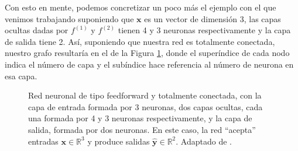 \documentclass[../../main.tex]{subfiles}
\begin{document}
Con esto en mente, podemos concretizar un poco más el ejemplo con el que venimos
trabajando suponiendo que \(\bm{x}\) es un vector de dimensión 3, las capas ocultas dadas
por \(f^{(1)}\) y \(f^{(2)}\) tienen 4 y 3 neuronas respectivamente y la capa de salida
tiene 2. Así, suponiendo que nuestra red es totalmente conectada, nuestro grafo resultaría
en el de la Figura \ref{fig:ff-neural-network}, donde el superíndice de cada nodo indica
el número de capa y el subíndice hace referencia al número de neurona en esa capa.
\begin{figure}
    \centering
    \caption{Red neuronal de tipo feedforward y totalmente conectada, con la capa de
    entrada formada por 3 neuronas, dos capas ocultas, cada una formada por 4 y 3 neuronas
    respectivamente, y la capa de salida, formada por dos neuronas. En este caso, la red
    ``acepta'' entradas \(\bm{x} \in \mathbb{R}^3\) y produce salidas \(\bm{\hat{y}} \in
    \mathbb{R}^2\). Adaptado de \cite{tikz-neural-networks}.}
    \label{fig:ff-neural-network}
\end{figure}
\end{document}
